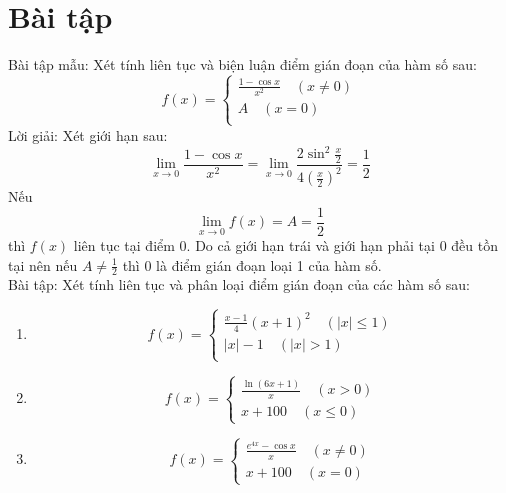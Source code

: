 \section{Bài tập}
Bài tập mẫu: Xét tính liên tục và biện luận điểm gián đoạn của hàm số sau:
\begin{equation*}
    f(x)=\left\{\begin{aligned}
        \frac{1-\cos{x}}{x^2} \quad(x\neq0)\\
         A\quad(x=0)\\
    \end{aligned}\right.
\end{equation*}
Lời giải: Xét giới hạn sau:
$$\lim_{x\to0}\frac{1-\cos{x}}{x^2}=\lim_{x\to0}\frac{2\sin^2{\frac{x}{2}}}{4(\frac{x}{2})^2}=\frac{1}{2}$$
Nếu $$\lim_{x\to0}f(x)=A=\frac{1}{2}$$ thì $f(x)$ liên tục tại điểm $0$.
Do cả giới hạn trái và giới hạn phải tại $0$ đều tồn tại nên nếu $A\neq\frac{1}{2}$ thì $0$ là điểm gián đoạn loại 1 của hàm số.
\\Bài tập: Xét tính liên tục và phân loại điểm gián đoạn của các hàm số sau:
\begin{enumerate}
    \item \begin{equation*}
        f(x)=\left\{\begin{aligned}
            \frac{x-1}{4}(x+1)^2 \quad(|x|\leq1)\\
            |x|-1 \quad(|x|>1)\\
        \end{aligned}\right.
    \end{equation*}
    \item \begin{equation*}
        f(x)=\left\{\begin{aligned}
            \frac{\ln(6x+1)}{x}\quad(x>0)\\
            x+100\quad(x\leq0)
        \end{aligned}\right.
    \end{equation*}
    \item \begin{equation*}
        f(x)=\left\{\begin{aligned}
            \frac{e^{4x}-\cos{x}}{x}\quad(x\neq0)\\
            x+100\quad(x=0)
        \end{aligned}\right.
    \end{equation*}
\end{enumerate}